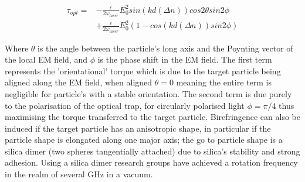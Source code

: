 \begin{equation}
	\label{eq:opt_torque}
	\begin{aligned}
		\tau_{opt} =& -\frac{\epsilon}{2\omega_{laser}}E_0^2sin(kd(\Delta n))cos2\theta sin2\phi \\ &+  \frac{\epsilon}{2\omega_{laser}}E_0^2 (1-cos(kd(\Delta n))sin2\phi)
	\end{aligned}
\end{equation}

Where $\theta$ is the angle between the particle's long axis and the Poynting
vector of the local EM field, and $\phi$ is the phase shift in the EM field.  
The first term represents the 'orientational' torque which is due to the target 
particle being aligned along the EM field, when aligned $\theta=0$ meaning 
the entire term is negligible for particle's with a stable orientation. The 
second term is due purely to the polarisation of the optical trap, for 
circularly polarised light $\phi=\pi/4$ thus maximising the torque transferred 
to the target particle. Birefringence can also be induced if the target 
particle has an anisotropic shape, in particular if the particle shape is 
elongated along one major axis; the go to particle shape is a silica dimer 
(two spheres tangentially attached) due to silica's stability and strong 
adhesion. Using a silica dimer research groups have achieved a rotation 
frequency in the realm of several GHz \cite{Ahn2018} in a vacuum. 

